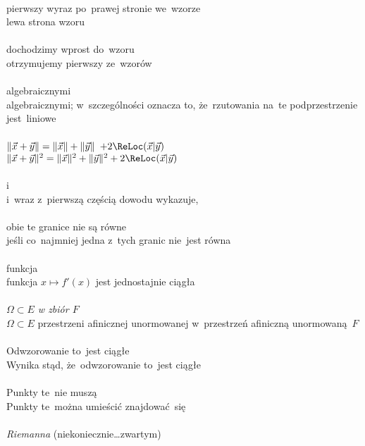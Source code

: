 \documentclass[a4paper,11pt]{article}
\numberwithin{equation}{section}
\begin{document}
 \\
\Jest pierwszy wyraz po~prawej stronie we~wzorze \\
\Powin  lewa strona wzoru \\
 \\
\Jest dochodzimy wprost do~wzoru \\
\Powin  otrzymujemy pierwszy ze~wzorów \\
 \\
\Jest algebraicznymi \\
\Powin algebraicznymi; w~szczególności oznacza to, że~rzutowania na~te
podprzestrzenie jest~liniowe \\
 \\
\Jest
$\Vert \vec{x} + \vec{y} \Vert = \Vert \vec{x} \Vert + \Vert \vec{y} \Vert$
$+ 2 \ReLoc( \vecx | \vecy )$ \\
\Powin $\Vert \vecx + \vecy \Vert^{ 2 } = \Vert \vecx \Vert^{ 2 }
+ \Vert \vecy \Vert^{ 2 } + 2 \ReLoc( \vecx | \vecy )$ \\
 \\
\Jest  i \\
\Powin i~wraz z~pierwszą częścią dowodu wykazuje, \\
 \\
\Jest  obie te granice nie są równe \\
\Powin jeśli co~najmniej jedna z~tych granic nie~jest równa \\
 \\
\Jest  funkcja \\
\Powin funkcja $x \mapsto f'( x )$ jest jednostajnie ciągła \\
 \\
\Jest \textit{$\Omega \subset E$ w zbiór $F$} \\
\Powin $\Omega \subset E$ przestrzeni afinicznej unormowanej
w~przestrzeń afiniczną unormowaną~$F$ \\
 \\
\Jest  Odwzorowanie to~jest ciągłe \\
\Powin Wynika stąd, że~odwzorowanie to~jest ciągłe \\
 \\
\Jest  Punkty te~nie muszą \\
\Powin Punkty te~można umieścić znajdować~się \\
 \\
\Jest  \textit{Riemanna} (niekoniecznie\ldots zwartym) \\
\end{document}
